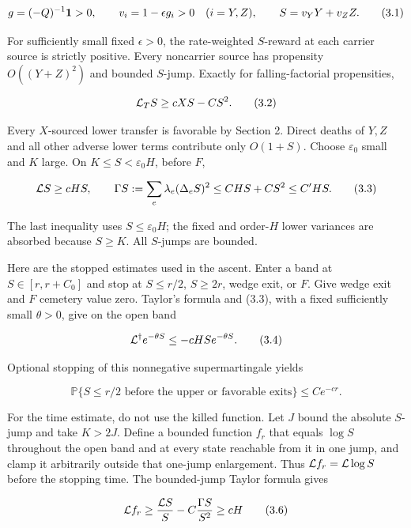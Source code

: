 \[
 g=(-Q)^{-1}{\bf1}>0,
 \qquad v_i=1-\epsilon g_i>0\quad(i=Y,Z),
 \qquad S=v_YY+v_ZZ.                                  \tag{3.1}
\]

For sufficiently small fixed \(\epsilon>0\), the rate-weighted
\(S\)-reward at each carrier source is strictly positive. Every
noncarrier source has propensity \(O((Y+Z)^2)\) and bounded \(S\)-jump.
Exactly for falling-factorial propensities,

\[
                       {\cal L}_TS\ge cXS-CS^2.        \tag{3.2}
\]

Every \(X\)-sourced lower transfer is favorable by Section 2. Direct
deaths of \(Y,Z\) and all other adverse lower terms contribute only
\(O(1+S)\). Choose \(\varepsilon_0\) small and \(K\) large. On
\(K\le S<\varepsilon_0H\), before \(F\),

\[
 {\cal L}S\ge cHS,
 \qquad
 \Gamma S:=\sum_e\lambda_e(\Delta_eS)^2
       \le CHS+CS^2\le C'HS.                          \tag{3.3}
\]

The last inequality uses \(S\le\varepsilon_0H\); the fixed and
order-\(H\) lower variances are absorbed because \(S\ge K\). All
\(S\)-jumps are bounded.

Here are the stopped estimates used in the ascent. Enter a band at
\(S\in[r,r+C_0]\) and stop at \(S\le r/2\), \(S\ge2r\), wedge exit, or
\(F\). Give wedge exit and \(F\) cemetery value zero. Taylor's formula
and (3.3), with a fixed sufficiently small \(\theta>0\), give on the
open band

\[
              {\cal L}^{\dagger}e^{-\theta S}
                    \le-cHS e^{-\theta S}.            \tag{3.4}
\]

Optional stopping of this nonnegative supermartingale yields

\[
 \mathbb P\{S\le r/2\text{ before the upper or favorable exits}\}
                    \le Ce^{-cr}.                     \tag{3.5}
\]

For the time estimate, do not use the killed function. Let \(J\) bound
the absolute \(S\)-jump and take \(K>2J\). Define a bounded function
\(f_r\) that equals \(\log S\) throughout the open band and at every
state reachable from it in one jump, and clamp it arbitrarily outside
that one-jump enlargement. Thus \({\cal L}f_r={\cal L}\log S\) before
the stopping time. The bounded-jump Taylor formula gives

\[
 {\cal L}f_r
 \ge \frac{{\cal L}S}{S}-C\frac{\Gamma S}{S^2}
 \ge cH                                                   \tag{3.6}
\]

